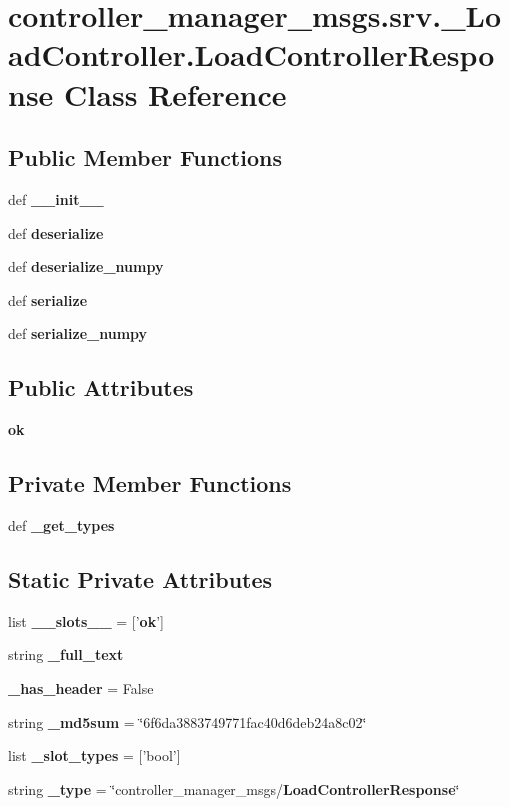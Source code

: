 \section{controller\-\_\-manager\-\_\-msgs.\-srv.\-\_\-\-Load\-Controller.\-Load\-Controller\-Response \-Class \-Reference}
\label{classcontroller__manager__msgs_1_1srv_1_1__LoadController_1_1LoadControllerResponse}
\subsection*{\-Public \-Member \-Functions}
\begin{DoxyCompactItemize}
\item 
def {\bf \-\_\-\-\_\-init\-\_\-\-\_\-}
\item 
def {\bf deserialize}
\item 
def {\bf deserialize\-\_\-numpy}
\item 
def {\bf serialize}
\item 
def {\bf serialize\-\_\-numpy}
\end{DoxyCompactItemize}
\subsection*{\-Public \-Attributes}
\begin{DoxyCompactItemize}
\item 
{\bf ok}
\end{DoxyCompactItemize}
\subsection*{\-Private \-Member \-Functions}
\begin{DoxyCompactItemize}
\item 
def {\bf \-\_\-get\-\_\-types}
\end{DoxyCompactItemize}
\subsection*{\-Static \-Private \-Attributes}
\begin{DoxyCompactItemize}
\item 
list {\bf \-\_\-\-\_\-slots\-\_\-\-\_\-} = ['{\bf ok}']
\item 
string {\bf \-\_\-full\-\_\-text}
\item 
{\bf \-\_\-has\-\_\-header} = \-False
\item 
string {\bf \-\_\-md5sum} = \char`\"{}6f6da3883749771fac40d6deb24a8c02\char`\"{}
\item 
list {\bf \-\_\-slot\-\_\-types} = ['bool']
\item 
string {\bf \-\_\-type} = \char`\"{}controller\-\_\-manager\-\_\-msgs/{\bf \-Load\-Controller\-Response}\char`\"{}
\end{DoxyCompactItemize}



